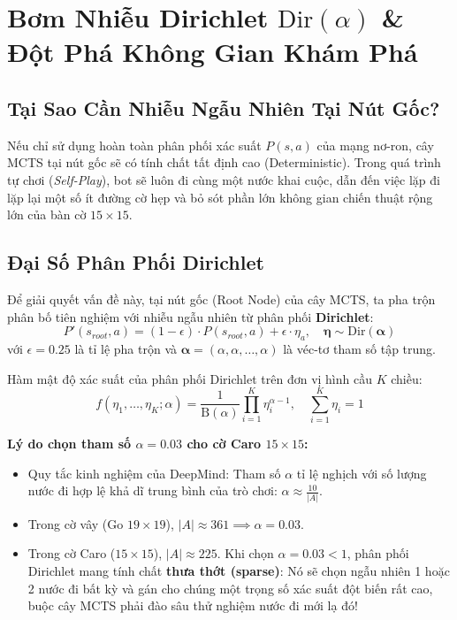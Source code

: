 \documentclass[12pt,a4paper,oneside]{report}
\begin{document}
\chapter{Bơm Nhiễu Dirichlet \texorpdfstring{$\text{Dir}(\alpha)$}{Dir(alpha)} \& Đột Phá Không Gian Khám Phá}

\section{Tại Sao Cần Nhiễu Ngẫu Nhiên Tại Nút Gốc?}

Nếu chỉ sử dụng hoàn toàn phân phối xác suất $P(s, a)$ của mạng nơ-ron, cây MCTS tại nút gốc sẽ có tính chất tất định cao (Deterministic). Trong quá trình tự chơi (\textit{Self-Play}), bot sẽ luôn đi cùng một nước khai cuộc, dẫn đến việc lặp đi lặp lại một số ít đường cờ hẹp và bỏ sót phần lớn không gian chiến thuật rộng lớn của bàn cờ $15 \times 15$.

\section{Đại Số Phân Phối Dirichlet}

Để giải quyết vấn đề này, tại nút gốc (Root Node) của cây MCTS, ta pha trộn phân bố tiên nghiệm với nhiễu ngẫu nhiên từ phân phối \textbf{Dirichlet}:
\begin{equation}
    P'(s_{root}, a) = (1 - \epsilon) \cdot P(s_{root}, a) + \epsilon \cdot \eta_a, \quad \boldsymbol{\eta} \sim \text{Dir}(\boldsymbol{\alpha})
\end{equation}
với $\epsilon = 0.25$ là tỉ lệ pha trộn và $\boldsymbol{\alpha} = (\alpha, \alpha, \dots, \alpha)$ là véc-tơ tham số tập trung.

Hàm mật độ xác suất của phân phối Dirichlet trên đơn vị hình cầu $K$ chiều:
\begin{equation}
    f(\eta_1, \dots, \eta_K; \alpha) = \frac{1}{\mathrm{B}(\alpha)} \prod_{i=1}^K \eta_i^{\alpha - 1}, \quad \sum_{i=1}^K \eta_i = 1
\end{equation}

\begin{pedagogy}
\textbf{Lý do chọn tham số $\alpha = 0.03$ cho cờ Caro $15 \times 15$:}
\begin{itemize}
    \item Quy tắc kinh nghiệm của DeepMind: Tham số $\alpha$ tỉ lệ nghịch với số lượng nước đi hợp lệ khả dĩ trung bình của trò chơi: $\alpha \approx \frac{10}{|A|}$.
    \item Trong cờ vây (Go $19 \times 19$), $|A| \approx 361 \implies \alpha = 0.03$.
    \item Trong cờ Caro ($15 \times 15$), $|A| \approx 225$. Khi chọn $\alpha = 0.03 < 1$, phân phối Dirichlet mang tính chất \textbf{thưa thớt (sparse)}: Nó sẽ chọn ngẫu nhiên 1 hoặc 2 nước đi bất kỳ và gán cho chúng một trọng số xác suất đột biến rất cao, buộc cây MCTS phải đào sâu thử nghiệm nước đi mới lạ đó!
\end{itemize}
\end{pedagogy}
\end{document}
